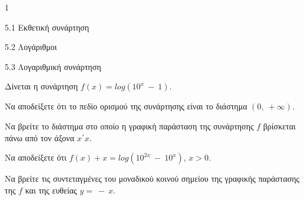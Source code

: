\begin{ylh}{1}
\item 5.1 Εκθετική συνάρτηση
\item 5.2 Λογάριθμοι
\item 5.3 Λογαριθμική συνάρτηση
\end{ylh}
Δίνεται η συνάρτηση $f(x) = log(10^{x}\  - \ 1)$.
\begin{alist}
\item Να αποδείξετε ότι το πεδίο ορισμού της συνάρτησης είναι το διάστημα $(0,\  + \infty)$.
\item Να βρείτε το διάστημα στο οποίο η γραφική παράσταση της συνάρτησης $f$ βρίσκεται πάνω από τον άξονα $x΄x$.
\item Να αποδείξετε ότι $f(x) + x = log(10^{2x}\  - \ 10^{x})$, $x > 0$.
\item Να βρείτε τις συντεταγμένες του μοναδικού κοινού σημείου της γραφικής παράστασης της $f$ και της ευθείας $y = \  - \ x$.
\end{alist}

